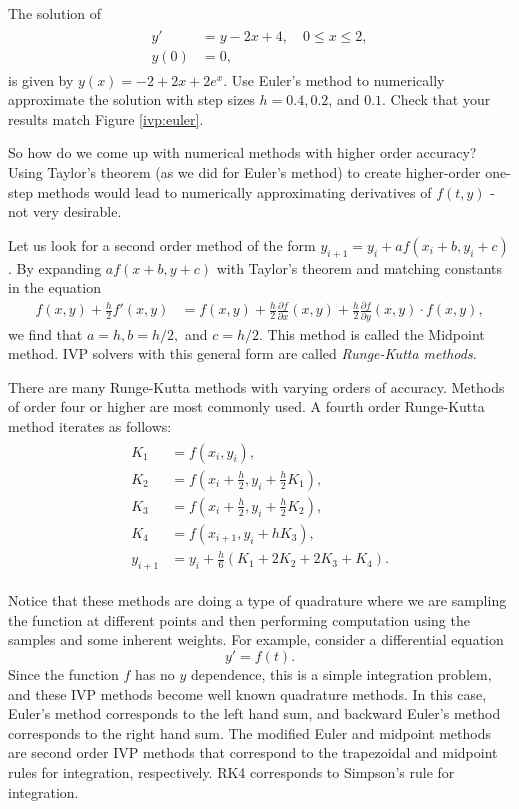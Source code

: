 \begin{problem} The solution of
\begin{align}
	\begin{split}
		y' &= y - 2x + 4,\quad 0 \leq x \leq 2, \\
		y(0) &= 0,
	\end{split}\label{ivp:prob1}
\end{align}
is given by $y(x) = -2+2x + 2e^x.$
Use Euler's method to numerically approximate the solution with step sizes $h = 0.4, 0.2$, and $0.1.$ 
Check that your results match Figure \ref{ivp:euler}.
\end{problem}

So how do we come up with numerical methods with higher order accuracy? 
Using Taylor's theorem (as we did for Euler's method) to create higher-order one-step methods would lead to numerically approximating derivatives of $f(t,y)$ - not very desirable.

Let us look for a second order method of the form $y_{i+1} = y_i + a f(x_i+b, y_i+c)$. 
By expanding $a f(x+b, y+c)$ with Taylor's theorem and matching constants in the equation
\begin{align*}
f(x,y) + \frac{h}{2}f'(x,y) &= f(x,y) + \frac{h}{2}\frac{\partial f}{\partial x}(x,y) + \frac{h}{2}\frac{\partial f}{\partial y}(x,y) \cdot f(x,y),
\end{align*}
we find that $a = h, b = h/2,$ and $c = h/2$. 
This method is called the Midpoint method. 
IVP solvers with this general form are called \textit{Runge-Kutta methods}. 

There are many Runge-Kutta methods with varying orders of accuracy. 
Methods of order four or higher are most commonly used. A fourth order Runge-Kutta method iterates as follows: 
\begin{align*}
	\begin{split}
K_1 &= f(x_i,y_i), \\
K_2 &= f(x_i + \frac{h}{2}, y_i + \frac{h}{2} K_1),\\
K_3 &= f(x_i + \frac{h}{2} , y_i + \frac{h}{2} K_2),\\
K_4 &= f(x_{i+1} , y_i + h K_3),\\
y_{i+1} &= y_i + \frac{h}{6}(K_1 + 2K_2 + 2K_3 + K_4).
	\end{split}
\end{align*}

Notice that these methods are doing a type of quadrature where we are sampling the function at different points and then performing computation using the samples and some inherent weights. 
For example, consider a differential equation 
\[ y' = f(t).\]
Since the function $f$ has no $y$ dependence, this is a simple integration problem, and these IVP methods become well known quadrature methods. In this case, Euler's method corresponds to the left hand sum, and backward Euler's method corresponds to the right hand sum. 
The modified Euler and midpoint methods are second order IVP methods that correspond to the trapezoidal and midpoint rules for integration, respectively. RK4 corresponds to Simpson's rule for integration.


